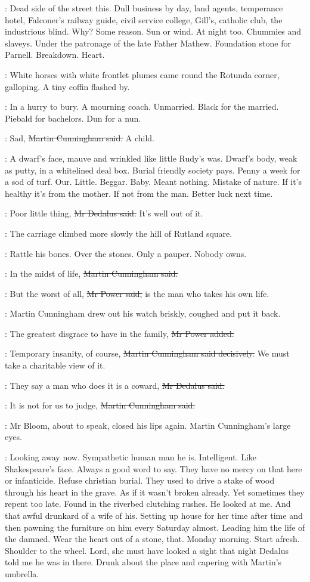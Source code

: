 \BloomInt:
Dead side of the street this.
Dull business by day,
land agents, temperance hotel,
Falconer's railway guide, civil service college,
Gill's, catholic club, the industrious blind.
Why?
Some reason.
Sun or wind.
At night too.
Chummies and slaveys.
Under the patronage of the late Father Mathew.
Foundation stone for Parnell.
Breakdown.
Heart.

:
White horses with white frontlet plumes came round the Rotunda corner,
galloping.
A tiny coffin flashed by.

\BloomInt:
In a hurry to bury.
A mourning coach.
Unmarried.
Black for the married.
Piebald for bachelors.
Dun for a nun.

\cunningham:
Sad,
\sout{Martin Cunningham said.}
A child.

\BloomInt:
A dwarf's face, mauve and wrinkled like little Rudy's was.
Dwarf's body, weak as putty, in a whitelined deal box.
Burial friendly society pays.
Penny a week for a sod of turf.
Our.
Little.
Beggar.
Baby.
Meant nothing.
Mistake of nature.
If it's healthy it's from the mother.
If not from the man.
Better luck next time.

\simon:
Poor little thing,
\sout{Mr Dedalus said.}
It's well out of it.

:
The carriage climbed more slowly the hill of Rutland square.

\BloomInt:
Rattle his bones.
Over the stones.
Only a pauper.
Nobody owns.

\cunningham:
In the midst of life,
\sout{Martin Cunningham said.}

\power:
But the worst of all,
\sout{Mr Power said,}
is the man who takes his own life.

:
Martin Cunningham drew out his watch briskly,
coughed and put it back.

\power:
The greatest disgrace to have in the family,
\sout{Mr Power added.}

\cunningham:
Temporary insanity, of course,
\sout{Martin Cunningham said decisively.}
We must take a charitable view of it.

\simon:
They say a man who does it is a coward,
\sout{Mr Dedalus said.}

\cunningham:
It is not for us to judge,
\sout{Martin Cunningham said.}

:
Mr Bloom, about to speak, closed his lips again.
Martin Cunningham's large eyes.

\BloomInt:
Looking away now.
Sympathetic human man he is.
Intelligent.
Like Shakespeare's face.
Always a good word to say.
They have no mercy on that here or infanticide.
Refuse christian burial.
They used to drive a stake of wood through his heart in the grave.
As if it wasn't broken already.
Yet sometimes they repent too late.
Found in the riverbed clutching rushes.
He looked at me.
And that awful drunkard of a wife of his.
Setting up house for her time after time
and then pawning the furniture on him every Saturday almost.
Leading him the life of the damned.
Wear the heart out of a stone, that.
Monday morning.
Start afresh.
Shoulder to the wheel.
Lord, she must have looked a sight that night Dedalus told me he was in there.
Drunk about the place and capering with Martin's umbrella.

